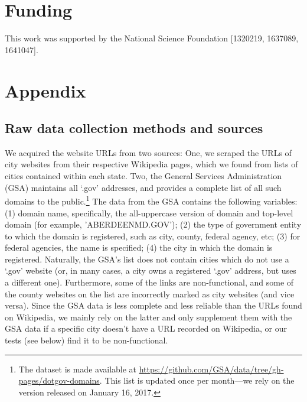 \documentclass[11pt]{article}
\begin{document}
\section*{Funding}
This work was supported by the National Science Foundation [1320219, 1637089, 1641047].

%
%

\newpage

%


\newpage
\section*{Appendix}

\subsection*{Raw data collection methods and sources}

We acquired the website URLs from two sources: One, we scraped the URLs of city websites from their respective Wikipedia pages, which we found from lists of cities contained within each state. Two, the General Services Administration (GSA) maintains all `.gov' addresses, and provides a complete list of all such domains to the public.\footnote{The dataset is made available at \url{https://github.com/GSA/data/tree/gh-pages/dotgov-domains}. This list is updated once per month---we rely on the version released on January 16, 2017.} The data from the GSA contains the following variables: (1) domain name, specifically, the all-uppercase version of domain and top-level domain (for example, 'ABERDEENMD.GOV'); (2) the type of government entity to which the domain is registered, such as city, county, federal agency, etc; (3) for federal agencies, the name is specified; (4) the city in which the domain is registered. Naturally, the GSA's list does not contain cities which do not use a `.gov' website (or, in many cases, a city owns a registered `.gov' address, but uses a different one). Furthermore, some of the links are non-functional, and some of the county websites on the list are incorrectly marked as city websites (and vice versa). Since the GSA data is less complete and less reliable than the URLs found on Wikipedia, we mainly rely on the latter and only supplement them with the GSA data if a specific city doesn't have a URL recorded on Wikipedia, or our tests (see below) find it to be non-functional.
\end{document}
